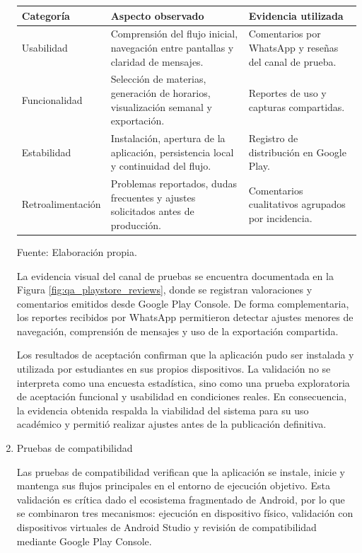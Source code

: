 \begin{enumerate}
\begin{center}
\begin{minipage}{\linewidth}
\centering
\begin{tabularx}{\linewidth}{@{}p{3.1cm}>{\RaggedRight\arraybackslash}X>{\RaggedRight\arraybackslash}p{3.4cm}@{}}
\toprule
Categoría & Aspecto observado & Evidencia utilizada \\
\midrule
Usabilidad & Comprensión del flujo inicial, navegación entre pantallas y claridad de mensajes. & Comentarios por WhatsApp y reseñas del canal de prueba. \\
Funcionalidad & Selección de materias, generación de horarios, visualización semanal y exportación. & Reportes de uso y capturas compartidas. \\
Estabilidad & Instalación, apertura de la aplicación, persistencia local y continuidad del flujo. & Registro de distribución en Google Play. \\
Retroalimentación & Problemas reportados, dudas frecuentes y ajustes solicitados antes de producción. & Comentarios cualitativos agrupados por incidencia. \\
\bottomrule
\end{tabularx}
\label{tab:qa_uat_retroalimentacion}
Fuente: Elaboración propia.
\end{minipage}
\end{center}

La evidencia visual del canal de pruebas se encuentra documentada en la Figura \ref{fig:qa_playstore_reviews}, donde se registran valoraciones y comentarios emitidos desde Google Play Console. De forma complementaria, los reportes recibidos por WhatsApp permitieron detectar ajustes menores de navegación, comprensión de mensajes y uso de la exportación compartida.

Los resultados de aceptación confirman que la aplicación pudo ser instalada y utilizada por estudiantes en sus propios dispositivos. La validación no se interpreta como una encuesta estadística, sino como una prueba exploratoria de aceptación funcional y usabilidad en condiciones reales. En consecuencia, la evidencia obtenida respalda la viabilidad del sistema para su uso académico y permitió realizar ajustes antes de la publicación definitiva.

  \item Pruebas de compatibilidad

Las pruebas de compatibilidad verifican que la aplicación se instale, inicie y mantenga sus flujos principales en el entorno de ejecución objetivo. Esta validación es crítica dado el ecosistema fragmentado de Android, por lo que se combinaron tres mecanismos: ejecución en dispositivo físico, validación con dispositivos virtuales de Android Studio y revisión de compatibilidad mediante Google Play Console.


\end{enumerate}
